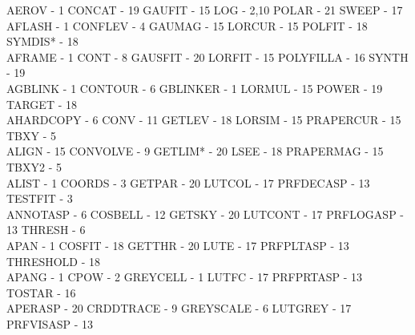 {\begin{tabbing}
 AEROV - 1                               \>CONCAT - 19
   \>GAUFIT - 15                             \>
 LOG - 2,10                              \>POLAR - 21
   \>SWEEP - 17                              \\
 AFLASH - 1                              \>CONFLEV - 4
   \>GAUMAG - 15                             \>
 LORCUR - 15                             \>POLFIT - 18
   \>SYMDIS* - 18                            \\
 AFRAME - 1                              \>CONT - 8
   \>GAUSFIT - 20                            \>
 LORFIT - 15                             \>POLYFILLA - 16
   \>SYNTH - 19                              \\
 AGBLINK - 1                             \>CONTOUR - 6
   \>GBLINKER - 1                            \>
 LORMUL - 15                             \>POWER - 19
   \>TARGET - 18                             \\
 AHARDCOPY - 6                           \>CONV - 11
   \>GETLEV - 18                             \>
 LORSIM - 15                             \>PRAPERCUR - 15
   \>TBXY - 5                                \\
 ALIGN - 15                              \>CONVOLVE - 9
   \>GETLIM* - 20                            \>
 LSEE - 18                               \>PRAPERMAG - 15
   \>TBXY2 - 5                               \\
 ALIST - 1                               \>COORDS - 3
   \>GETPAR - 20                             \>
 LUTCOL - 17                             \>PRFDECASP - 13
   \>TESTFIT - 3                             \\
 ANNOTASP - 6                            \>COSBELL - 12
   \>GETSKY - 20                             \>
 LUTCONT - 17                            \>PRFLOGASP - 13
   \>THRESH - 6                              \\
 APAN - 1                                \>COSFIT - 18
   \>GETTHR - 20                             \>
 LUTE - 17                               \>PRFPLTASP - 13
   \>THRESHOLD - 18                          \\
 APANG - 1                               \>CPOW - 2
   \>GREYCELL - 1                            \>
 LUTFC - 17                              \>PRFPRTASP - 13
   \>TOSTAR - 16                             \\
 APERASP - 20                            \>CRDDTRACE - 9
   \>GREYSCALE - 6                           \>
 LUTGREY - 17                            \>PRFVISASP - 13

\end{tabbing}}
